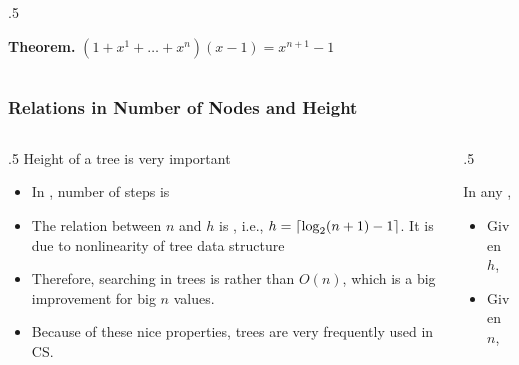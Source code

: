 \documentclass[10pt]{beamer}
\DeclarePairedDelimiter\ceil{\lceil}{\rceil}
\begin{document}
\begin{frame}[t]
\begin{columns}[T]
\begin{column}{.5\linewidth}
\begin{example}
{		} %
		\end{example}
		
		{\footnotesize  
		\textbf{Theorem.} $ (1 + x^{1} + \dotsc + x^{n})(x-1) = x^{n + 1} -1$
		} %
	\end{column} %
	\end{columns} %
\end{frame}




\begin{frame}[t]\frametitle{Relations in Number of Nodes and Height}
{\footnotesize
	\begin{columns}[T] %
	\begin{column}{.5\linewidth} %
	    	Height of a tree is very important
		\begin{itemize}
			\item
			In , number of steps is 
			
			\item
			The relation between $n$ and $h$ is ,
			i.e., $h = \ceil*{\log_{2}(n + 1) - 1}$.
			It is due to nonlinearity of tree data structure
			
			\item
			Therefore, searching in trees is  rather than $O(n)$,
			which is a big improvement for big $n$ values.
			
			\item 
			Because of these nice properties, 
			trees are very frequently used in CS.
			
		\end{itemize}
	\end{column} %
	\begin{column}{.5\linewidth} %
		{\footnotesize
 	    	In any ,
		\begin{itemize}
				
			\item 
			Given $h$, 
			
			\item
			 Given $n$,
		
		\end{itemize}
		} %


\end{column}
\end{columns}}
\end{frame}
\end{document}
